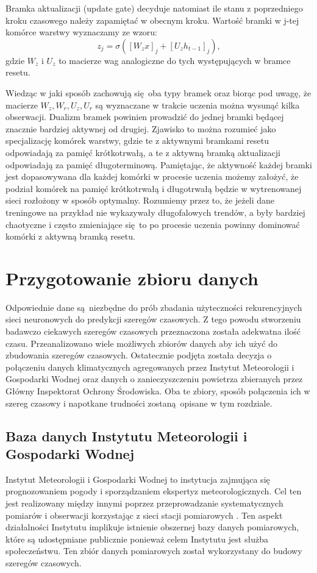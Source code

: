 \documentclass[10pt,a4paper]{article}
\begin{document}
Bramka aktualizacji (update gate) decyduje natomiast ile stanu z poprzedniego kroku czasowego należy zapamiętać w obecnym kroku. Wartość bramki w j-tej komórce warstwy wyznaczamy ze wzoru:
\begin{equation}
	z_j = \sigma([W_zx]_j + [U_zh_{t-1}]_j),
\end{equation} 
gdzie $W_z$ i $U_z$ to macierze wag analogiczne do tych występujących w bramce resetu. 

Wiedząc w jaki sposób zachowują się oba typy bramek oraz biorąc pod uwagę, że macierze $W_z, W_r, U_z, U_r$ są wyznaczane w trakcie uczenia można wysunąć kilka obserwacji. Dualizm bramek powinien prowadzić do jednej bramki będącej znacznie bardziej aktywnej od drugiej. Zjawisko to można rozumieć jako specjalizację komórek warstwy, gdzie te z aktywnymi bramkami resetu odpowiadają za pamięć krótkotrwałą, a te z aktywną bramką aktualizacji odpowiadają za pamięć długoterminową. Pamiętając, że aktywność każdej bramki jest dopasowywana dla każdej komórki w procesie uczenia możemy założyć, że podział komórek na pamięć krótkotrwałą i długotrwałą będzie w wytrenowanej sieci rozłożony w sposób optymalny. Rozumiemy przez to, że jeżeli dane treningowe na przykład nie wykazywały długofalowych trendów, a były bardziej chaotyczne i często zmieniające się to po procesie uczenia powinny dominować komórki z aktywną bramką resetu.

\newpage
\section{Przygotowanie zbioru danych}
Odpowiednie dane są niezbędne do prób zbadania użyteczności rekurencyjnych sieci neuronowych do predykcji szeregów czasowych. Z tego powodu stworzeniu badawczo ciekawych szeregów czasowych przeznaczona została adekwatna ilość czasu. Przeanalizowano wiele możliwych zbiorów danych aby ich użyć do zbudowania szeregów czasowych. Ostatecznie podjęta została decyzja o połączeniu danych klimatycznych agregowanych przez Instytut Meteorologii i Gospodarki Wodnej oraz danych o zanieczyszczeniu powietrza zbieranych przez Główny Inspektorat Ochrony Środowiska. Oba te zbiory, sposób połączenia ich w szereg czasowy i napotkane trudności zostaną opisane w tym rozdziale. 

\subsection{Baza danych Instytutu Meteorologii i Gospodarki Wodnej}
Instytut Meteorologii i Gospodarki Wodnej to instytucja zajmująca się prognozowaniem pogody i sporządzaniem ekspertyz meteorologicznych. Cel ten jest realizowany między innymi poprzez przeprowadzanie systematycznych pomiarów i obserwacji korzystając z sieci stacji pomiarowych \cite{imgwTask}. Ten aspekt działalności Instytutu implikuje istnienie obszernej bazy danych pomiarowych, które są udostępniane publicznie ponieważ celem Instytutu jest służba społeczeństwu. Ten zbiór danych pomiarowych został wykorzystany do budowy szeregów czasowych. 
\end{document}
